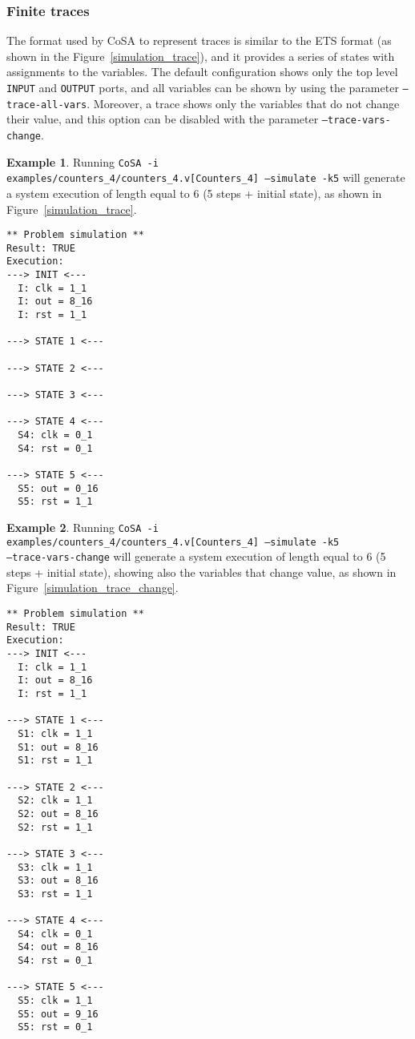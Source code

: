 \documentclass{article}
\theoremstyle{definition}
\newtheorem{example}{Example}[section]
\begin{document}
\subsubsection{Finite traces}

The format used by CoSA to represent traces is similar to the ETS
format (as shown in the Figure~\ref{simulation_trace}), and it
provides a series of states with assignments to the variables. The
default configuration shows only the top level \texttt{INPUT} and
\texttt{OUTPUT} ports, and all variables can be shown by using the
parameter \texttt{--trace-all-vars}. Moreover, a trace shows only the
variables that do not change their value, and this option can be
disabled with the parameter \texttt{--trace-vars-change}.

\begin{example}
  Running \texttt{CoSA -i examples/counters\_4/counters\_4.v[Counters\_4] --simulate -k5}
  will generate a system execution of length equal to 6 (5 steps + initial state), as
  shown in Figure~\ref{simulation_trace}.

\begin{lstlisting}[frame=single,language=ets,caption=Simulation Counter\_4 ,label=simulation_trace]
** Problem simulation **
Result: TRUE
Execution:
---> INIT <---
  I: clk = 1_1
  I: out = 8_16
  I: rst = 1_1

---> STATE 1 <---

---> STATE 2 <---

---> STATE 3 <---

---> STATE 4 <---
  S4: clk = 0_1
  S4: rst = 0_1

---> STATE 5 <---
  S5: out = 0_16
  S5: rst = 1_1
\end{lstlisting}

\end{example}

\begin{example}
  Running \texttt{CoSA -i
    examples/counters\_4/counters\_4.v[Counters\_4] --simulate -k5\\
    --trace-vars-change} will generate a system execution of length
  equal to 6 (5 steps + initial state), showing also the variables
  that change value, as shown in Figure~\ref{simulation_trace_change}.

\begin{lstlisting}[frame=single,language=ets,caption=Simulation Counter\_4 (with changing values),label=simulation_trace_change]
** Problem simulation **
Result: TRUE
Execution:
---> INIT <---
  I: clk = 1_1
  I: out = 8_16
  I: rst = 1_1

---> STATE 1 <---
  S1: clk = 1_1
  S1: out = 8_16
  S1: rst = 1_1

---> STATE 2 <---
  S2: clk = 1_1
  S2: out = 8_16
  S2: rst = 1_1

---> STATE 3 <---
  S3: clk = 1_1
  S3: out = 8_16
  S3: rst = 1_1

---> STATE 4 <---
  S4: clk = 0_1
  S4: out = 8_16
  S4: rst = 0_1

---> STATE 5 <---
  S5: clk = 1_1
  S5: out = 9_16
  S5: rst = 0_1
\end{lstlisting}

\end{example}
\end{document}

